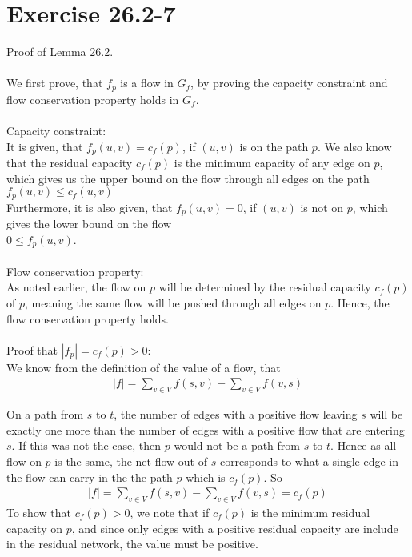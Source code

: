 \section{Exercise 26.2-7}
Proof of Lemma 26.2.
\\
\\
We first prove, that $f_p$ is a flow in $G_f$, by proving the capacity constraint and flow conservation property holds in $G_f$.
\\
\\
Capacity constraint:
\\
It is given, that $f_p(u,v)=c_f(p)$, if $(u,v)$ is on the path $p$. We also know that the residual capacity $c_f(p)$ is the minimum capacity of any edge on $p$, which gives us the upper bound on the flow through all edges on the path
\\
$f_p(u,v)\leq c_f(u,v)$
\\
Furthermore, it is also given, that $f_p(u,v)=0$, if $(u,v)$ is not on $p$, which gives the lower bound on the flow
\\
$0 \leq f_p(u,v)$.
\\
\\
Flow conservation property:
\\
As noted earlier, the flow on $p$ will be determined by the residual capacity $c_f(p)$ of $p$, meaning the same flow will be pushed through all edges on $p$. Hence, the flow conservation property holds.
\\
\\
Proof that $|f_p| = c_f(p)>0$:
\\
We know from the definition of the value of a flow, that 
\begin{align}
|f| = \sum_{v\in V}f(s,v) - \sum_{v\in V}f(v,s)
\end{align}

On a path from $s$ to $t$, the number of edges with a positive flow leaving $s$ will be exactly one more than the number of edges with a positive flow that are entering $s$. If this was not the case, then $p$ would not be a path from $s$ to $t$. Hence as all flow on $p$ is the same, the net flow out of $s$ corresponds to what a single edge in the flow can carry in the the path $p$ which is $c_f(p)$. So
\begin{align}
|f| = \sum_{v\in V}f(s,v) - \sum_{v\in V}f(v,s) = c_f(p)
\end{align}
To show that $c_f(p)>0$, we note that if $c_f(p)$ is the minimum residual capacity on $p$, and since only edges with a positive residual capacity are include in the residual network, the value must be positive.